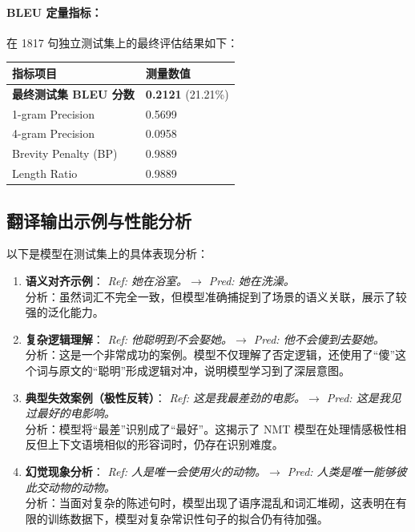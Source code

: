 \documentclass[11pt,a4paper]{article}
\begin{document}
\paragraph{BLEU 定量指标：}
在 1817 句独立测试集上的最终评估结果如下：
\begin{table}[h]
\centering
\begin{tabular}{ll}
\toprule
指标项目 & 测量数值 \\
\midrule
\textbf{最终测试集 BLEU 分数} & \textbf{0.2121} (21.21\%) \\
1-gram Precision & 0.5699 \\
4-gram Precision & 0.0958 \\
Brevity Penalty (BP) & 0.9889 \\
Length Ratio & 0.9889 \\
\bottomrule
\end{tabular}
\end{table}

\subsection{翻译输出示例与性能分析}

以下是模型在测试集上的具体表现分析：

\begin{enumerate}
    \item \textbf{语义对齐示例}：
    \textit{Ref: 她在浴室。$\rightarrow$ Pred: 她在洗澡。} \\
    分析：虽然词汇不完全一致，但模型准确捕捉到了场景的语义关联，展示了较强的泛化能力。
    
    \item \textbf{复杂逻辑理解}：
    \textit{Ref: 他聪明到不会娶她。$\rightarrow$ Pred: 他不会傻到去娶她。} \\
    分析：这是一个非常成功的案例。模型不仅理解了否定逻辑，还使用了“傻”这个词与原文的“聪明”形成逻辑对冲，说明模型学习到了深层意图。
    
    \item \textbf{典型失效案例（极性反转）}：
    \textit{Ref: 这是我最差劲的电影。$\rightarrow$ Pred: 这是我见过最好的电影响。} \\
    分析：模型将“最差”识别成了“最好”。这揭示了 NMT 模型在处理情感极性相反但上下文语境相似的形容词时，仍存在识别难度。
    
    \item \textbf{幻觉现象分析}：
    \textit{Ref: 人是唯一会使用火的动物。$\rightarrow$ Pred: 人类是唯一能够彼此交动物的动物。} \\
    分析：当面对复杂的陈述句时，模型出现了语序混乱和词汇堆砌，这表明在有限的训练数据下，模型对复杂常识性句子的拟合仍有待加强。
\end{enumerate}
\end{document}

